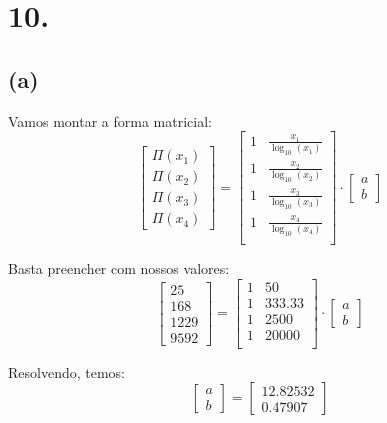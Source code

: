 \documentclass[12pt]{article}
\begin{document}
\section*{10.}
\subsection*{(a)}
Vamos montar a forma matricial:
\[
\begin{bmatrix}
    \Pi(x_1) \\
    \Pi(x_2) \\
    \Pi(x_3) \\
    \Pi(x_4)
\end{bmatrix}
=
\begin{bmatrix}
    1 & \frac{x_1}{\log_{10}{(x_1)}} \\
    1 & \frac{x_2}{\log_{10}{(x_2)}} \\
    1 & \frac{x_3}{\log_{10}{(x_3)}} \\
    1 & \frac{x_4}{\log_{10}{(x_4)}} \\
\end{bmatrix}
\cdot
\begin{bmatrix}
    a \\
    b
\end{bmatrix}
\]

Basta preencher com nossos valores:
\[
\begin{bmatrix}
    25 \\
    168 \\
    1229 \\
    9592
\end{bmatrix}
=
\begin{bmatrix}
    1 & 50 \\
    1 & 333.33 \\
    1 & 2500 \\
    1 & 20000 \\
\end{bmatrix}
\cdot
\begin{bmatrix}
    a \\
    b
\end{bmatrix}
\]

Resolvendo, temos:
\[
\begin{bmatrix}
    a \\
    b
\end{bmatrix}
=
\begin{bmatrix}
    12.82532 \\
     0.47907
\end{bmatrix}
\]
\end{document}
